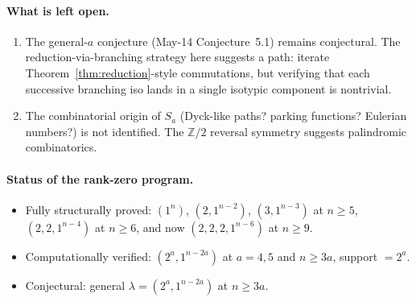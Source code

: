 \documentclass[11pt]{article}
\theoremstyle{definition}
\begin{document}
\paragraph{What is left open.}
\begin{enumerate}[leftmargin=2em,topsep=0.3em,itemsep=0.2em]
\item The general-$a$ conjecture (May-14 Conjecture~5.1) remains
conjectural.  The reduction-via-branching strategy here suggests a
path: iterate Theorem~\ref{thm:reduction}-style commutations, but
verifying that each successive branching iso lands in a single
isotypic component is nontrivial.
\item The combinatorial origin of $S_a$ (Dyck-like paths? parking
functions? Eulerian numbers?) is not identified.  The $\mathbb{Z}/2$
reversal symmetry suggests palindromic combinatorics.
\end{enumerate}

\paragraph{Status of the rank-zero program.}
\begin{itemize}[leftmargin=2em,topsep=0.3em,itemsep=0.2em]
\item Fully structurally proved: $(1^n)$, $(2,1^{n-2})$,
$(3,1^{n-3})$ at $n\ge 5$, $(2,2,1^{n-4})$ at $n\ge 6$, and now
$(2,2,2,1^{n-6})$ at $n\ge 9$.
\item Computationally verified: $(2^a,1^{n-2a})$ at $a=4,5$ and
$n\ge 3a$, support $=2^a$.
\item Conjectural: general $\lambda=(2^a,1^{n-2a})$ at $n\ge 3a$.
\end{itemize}
\end{document}

